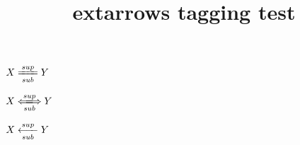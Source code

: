 \documentclass{article}
\title{extarrows tagging test}
\begin{document}
$X\xlongequal[sub]{sup}Y$

$X\xLongleftrightarrow[sub]{sup}Y$

$X\xlongleftarrow[sub]{sup}Y$
\end{document}

